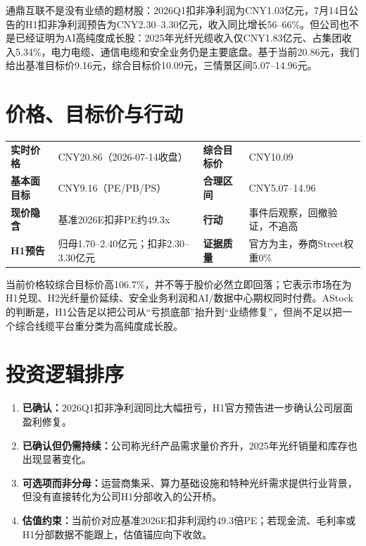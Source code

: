 \begin{houseviewbox}[核心判断]
通鼎互联不是没有业绩的题材股：2026Q1扣非净利润为CNY1.03亿元，7月14日公告的H1扣非净利润预告为CNY2.30--3.30亿元，收入同比增长56--66\%。但公司也不是已经证明为AI高纯度成长股：2025年光纤光缆收入仅CNY1.83亿元、占集团收入5.34\%，电力电缆、通信电缆和安全业务仍是主要底盘。基于当前20.86元，我们给出基准目标价9.16元，综合目标价10.09元，三情景区间5.07--14.96元。
\end{houseviewbox}

\section{价格、目标价与行动}
\begin{exhibitbox}
\begin{tabularx}{\exhibitboxwidth}{L{3.0cm}X L{3.0cm}X}
\textbf{实时价格} & CNY20.86（2026-07-14收盘） & \textbf{综合目标价} & CNY10.09 \\
\textbf{基本面目标} & CNY9.16（PE/PB/PS） & \textbf{合理区间} & CNY5.07--14.96 \\
\textbf{现价隐含} & 基准2026E扣非PE约49.3x & \textbf{行动} & 事件后观察，回撤验证，不追高 \\
\textbf{H1预告} & 归母1.70--2.40亿元；扣非2.30--3.30亿元 & \textbf{证据质量} & 官方为主，券商Street权重0\% \\
\end{tabularx}
\end{exhibitbox}

当前价格较综合目标价高106.7\%，并不等于股价必然立即回落；它表示市场在为H1兑现、H2光纤量价延续、安全业务利润和AI/数据中心期权同时付费。AStock的判断是，H1公告足以把公司从“亏损底部”抬升到“业绩修复”，但尚不足以把一个综合线缆平台重分类为高纯度成长股。

\section{投资逻辑排序}
\begin{enumerate}
\item \textbf{已确认：}2026Q1扣非净利润同比大幅扭亏，H1官方预告进一步确认公司层面盈利修复。
\item \textbf{已确认但仍需持续：}公司称光纤产品需求量价齐升，2025年光纤销量和库存也出现显著变化。
\item \textbf{可选项而非分母：}运营商集采、算力基础设施和特种光纤需求提供行业背景，但没有直接转化为公司H1分部收入的公开桥。
\item \textbf{估值约束：}当前价对应基准2026E扣非利润约49.3倍PE；若现金流、毛利率或H1分部数据不能跟上，估值锚应向下收敛。
\end{enumerate}

